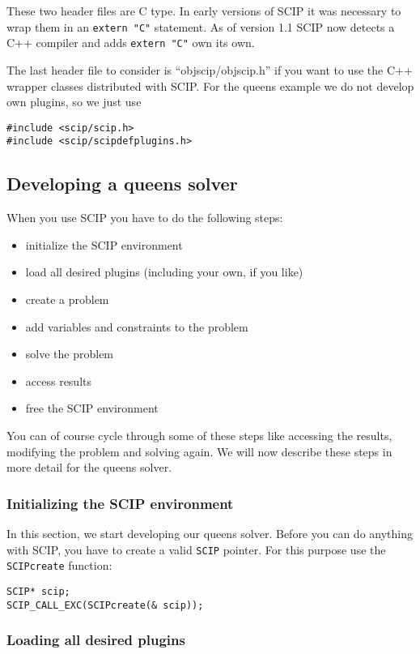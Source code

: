 \documentclass[a4paper]{article}
\begin{document}
These two header files are C type. In early versions of SCIP it was necessary to wrap them in an \verb+extern "C"+
statement. As of version 1.1 SCIP now detects a C++ compiler and adds \verb+extern "C"+ own its own.

The last header file to consider is ``objscip/objscip.h'' if you want to use the C++ wrapper classes distributed  with
SCIP. For the queens example we do not develop own plugins, so we just use
\begin{verbatim}
#include <scip/scip.h>
#include <scip/scipdefplugins.h>
\end{verbatim}

\subsection{Developing a queens solver}

When you use SCIP you have to do the following steps:
\begin{itemize}
\item initialize the SCIP environment
\item load all desired plugins (including your own, if you like)
\item create a problem
\item add variables and constraints to the problem
\item solve the problem
\item access results
\item free the SCIP environment
\end{itemize}
You can of course cycle through some of these steps like accessing the results, modifying the problem and
solving again. We will now describe these steps in more detail for the queens solver.

\subsubsection{Initializing the SCIP environment}

In this section, we start developing our queens solver. Before you can do anything with SCIP, you have to
create a valid \verb+SCIP+ pointer. For this purpose use the \verb+SCIPcreate+ function:
\begin{verbatim}
SCIP* scip;
SCIP_CALL_EXC(SCIPcreate(& scip));
\end{verbatim}

\subsubsection{Loading all desired plugins}
\end{document}
